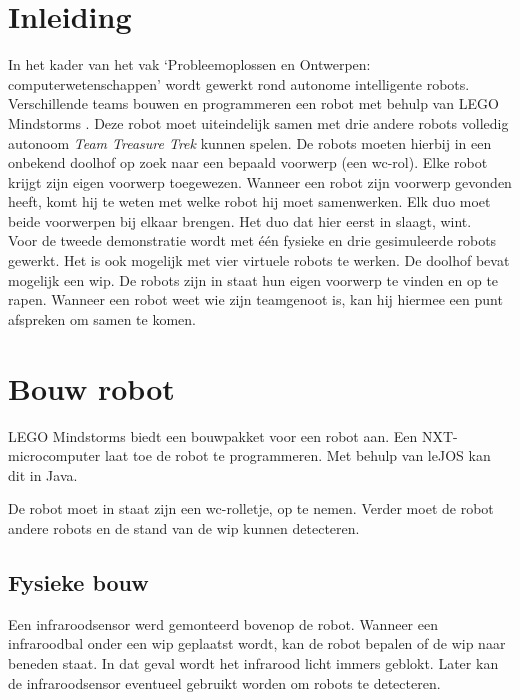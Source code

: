 \documentclass[tt2]{penoverslag}
\begin{document}
\newpage


\section{Inleiding} %
\label{ssec:inl}
In het kader van het vak `Probleemoplossen en Ontwerpen: computerwetenschappen' wordt gewerkt rond autonome intelligente robots. Verschillende teams bouwen en programmeren een robot met behulp van LEGO Mindstorms \cite{mindstorms}. Deze robot moet uiteindelijk samen met drie andere robots volledig autonoom \textit{Team Treasure Trek} \cite{TeamTreasure} kunnen spelen.
De robots moeten hierbij in een onbekend doolhof op zoek naar een bepaald voorwerp (een wc-rol). Elke robot krijgt zijn eigen voorwerp toegewezen. Wanneer een robot zijn voorwerp gevonden heeft, komt hij te weten met welke robot hij moet samenwerken. Elk duo moet beide voorwerpen bij elkaar brengen. Het duo dat hier eerst in slaagt, wint.\\

Voor de tweede demonstratie wordt met \'e\'en fysieke en drie gesimuleerde robots gewerkt. Het is ook mogelijk met vier virtuele robots te werken. De doolhof bevat mogelijk een wip. De robots zijn in staat hun eigen voorwerp te vinden en op te rapen. Wanneer een robot weet wie zijn teamgenoot is, kan hij hiermee een punt afspreken om samen te komen.\\


\section{Bouw robot}
\label{ssec:bouwrob}
LEGO Mindstorms \cite{mindstorms} biedt een bouwpakket voor een robot aan. Een NXT-microcomputer laat toe de robot te programmeren. Met behulp van leJOS \cite{leJOS} kan dit in Java.

De robot moet in staat zijn een wc-rolletje, op te nemen. Verder moet de robot andere robots en de stand van de wip kunnen detecteren.

\subsection{Fysieke bouw}
\label{ssec:fysb}
Een infraroodsensor werd gemonteerd bovenop de robot. Wanneer een infraroodbal onder een wip geplaatst wordt, kan de robot bepalen of de wip naar beneden staat. In dat geval wordt het infrarood licht immers geblokt. Later kan de infraroodsensor eventueel gebruikt worden om robots te detecteren.\\
\end{document}
